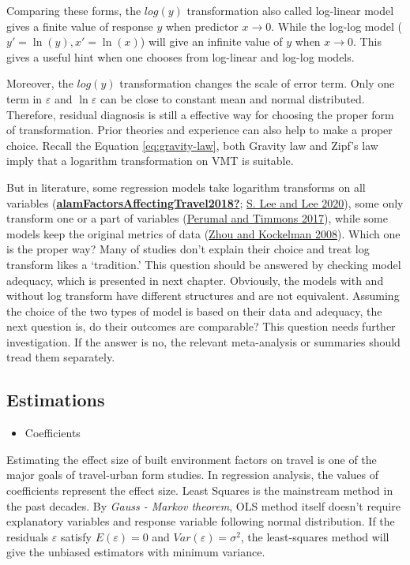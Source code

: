 \documentclass[
  11pt,
  openany]{memoir}
\providecommand{\tightlist}{%
  \setlength{\itemsep}{0pt}\setlength{\parskip}{0pt}}
\begin{document}
Comparing these forms, the \(log(y)\) transformation also called log-linear model gives a finite value of response \(y\) when predictor \(x\to 0\).
While the log-log model (\(y'=\ln(y),x'=\ln(x)\)) will give an infinite value of \(y\) when \(x\to 0\).
This gives a useful hint when one chooses from log-linear and log-log models.

Moreover, the \(log(y)\) transformation changes the scale of error term.
Only one term in \(\varepsilon\) and \(\ln\varepsilon\) can be close to constant mean and normal distributed.
Therefore, residual diagnosis is still a effective way for choosing the proper form of transformation.
Prior theories and experience can also help to make a proper choice.
Recall the Equation \eqref{eq:gravity-law}, both Gravity law and Zipf's law imply that a logarithm transformation on VMT is suitable.

But in literature, some regression models take logarithm transforms on all variables (\protect\hyperlink{ref-alamFactorsAffectingTravel2018}{\textbf{alamFactorsAffectingTravel2018?}}; \protect\hyperlink{ref-leeComparingImpactsLocal2020}{S. Lee and Lee 2020}), some only transform one or a part of variables (\protect\hyperlink{ref-perumalContextualDensityUS2017}{Perumal and Timmons 2017}), while some models keep the original metrics of data (\protect\hyperlink{ref-zhouSelfSelectionHomeChoice2008}{Zhou and Kockelman 2008}).
Which one is the proper way?
Many of studies don't explain their choice and treat log transform likes a `tradition.'
This question should be answered by checking model adequacy, which is presented in next chapter.
Obviously, the models with and without log transform have different structures and are not equivalent.
Assuming the choice of the two types of model is based on their data and adequacy, the next question is, do their outcomes are comparable?
This question needs further investigation.
If the answer is no, the relevant meta-analysis or summaries should tread them separately.

\hypertarget{estimations}{%
\subsection{Estimations}\label{estimations}}

\begin{itemize}
\tightlist
\item
  Coefficients
\end{itemize}

Estimating the effect size of built environment factors on travel is one of the major goals of travel-urban form studies.
In regression analysis, the values of coefficients represent the effect size.
Least Squares is the mainstream method in the past decades. By \emph{Gauss - Markov theorem}, OLS method itself doesn't require explanatory variables and response variable following normal distribution. If the residuals \(\varepsilon\) satisfy \(E(\varepsilon) = 0\) and \(Var(\varepsilon) = \sigma^2\), the least-squares method will give the unbiased estimators with minimum variance.
\end{document}
